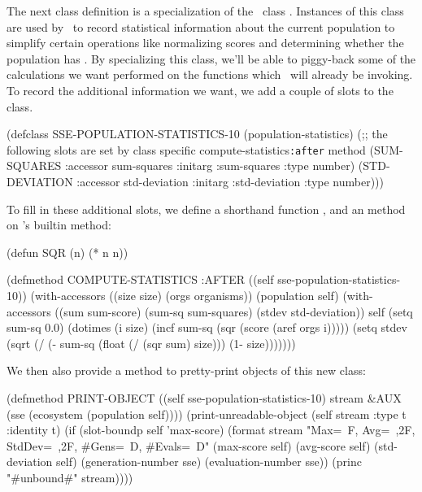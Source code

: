 \filbreak

{\samepage
The next class definition is a specialization of the \geco\ class
. Instances of this class are used by \geco\ to record
statistical information about the current population to simplify certain operations
like normalizing scores and determining whether the population
has . By specializing this class, we'll be able to
piggy-back some of the calculations we want performed on the functions which \geco\
will already be invoking. To record the additional information we want, we add a couple
of slots to the class.
\begin{clcode}(defclass SSE-POPULATION-STATISTICS-10 (population-statistics)
  (;; {\sf the following slots are set by class specific compute-statistics{\tt :after} method }
   (SUM-SQUARES
    :accessor sum-squares
    :initarg :sum-squares
    :type number)
   (STD-DEVIATION
    :accessor std-deviation
    :initarg :std-deviation
    :type number)))\end{clcode}
}%

\filbreak

{\samepage
To fill in these additional slots, we define a shorthand function , and an 
method on \geco's builtin \inxmethod{compute-statistics} method:
\begin{code}(defun SQR (n)
  (* n n))

(defmethod COMPUTE-STATISTICS :AFTER ((self sse-population-statistics-10))
  (with-accessors ((size size)
                   (orgs organisms))
                  (population self)
    (with-accessors ((sum sum-score)
                     (sum-sq sum-squares)
                     (stdev std-deviation))
                    self
      (setq sum-sq 0.0)
      (dotimes (i size)
        (incf sum-sq (sqr (score (aref orgs i)))))
      (setq stdev (sqrt (/ (- sum-sq (float (/ (sqr sum) size)))
                           (1- size)))))))\end{code}
}%

\filbreak

{\samepage

We then also provide a method to pretty-print objects of this new class:
\begin{code}(defmethod PRINT-OBJECT ((self sse-population-statistics-10) stream &AUX
                         (sse (ecosystem (population self))))
  (print-unreadable-object (self stream :type t :identity t)
    (if (slot-boundp self 'max-score)
        (format stream "Max=~F, Avg=~,2F, StdDev=~,2F, #Gens=~D, #Evals=~D"
                (max-score self)
                (avg-score self)
                (std-deviation self)
                (generation-number sse)
                (evaluation-number sse))
      (princ "#unbound#" stream))))\end{code}

}%

